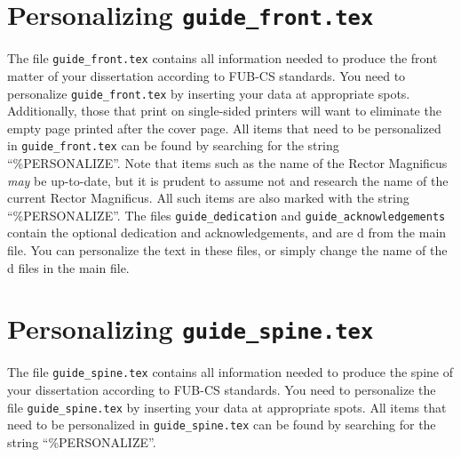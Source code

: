 \section{Personalizing {\tt guide\_front.tex}}
The file {\tt guide\_front.tex} contains all information needed 
to produce the front matter of your dissertation according to FUB-CS standards.
You need to personalize {\tt guide\_front.tex} by inserting your data
at appropriate spots. Additionally, those that print on single-sided
printers will want to eliminate the empty page printed after the cover page.
All items that need to be personalized in 
{\tt guide\_front.tex} can be found by searching for the string 
``\%{}PERSONALIZE''.
Note that items such as the name of the Rector Magnificus {\em may} be 
up-to-date, but it is prudent to assume not and research the name of
the current Rector Magnificus. All such items are also marked with
the string ``\%{}PERSONALIZE''.
The files {\tt guide\_dedication} and {\tt guide\_acknowledgements} 
contain the optional dedication and acknowledgements, and are \verb||d
from the main file.
You can personalize the text in these files, or simply change the name
of the \verb||d files in the main file.

\section{Personalizing {\tt guide\_spine.tex}}
The file {\tt guide\_spine.tex} contains all information needed
to produce the spine of your dissertation according to FUB-CS standards.
You need to personalize the file {\tt guide\_spine.tex} by inserting 
your data at appropriate spots. All items that need to be personalized in
{\tt guide\_spine.tex} can be found by searching for the string
``\%{}PERSONALIZE''.
